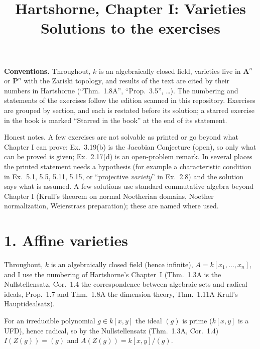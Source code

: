 \documentclass[11pt]{article}
\title{Hartshorne, Chapter I: Varieties\\[2pt]\large Solutions to the exercises}
\author{}
\date{}
\begin{document}
\maketitle
\noindent\textbf{Conventions.} Throughout, $k$ is an algebraically closed field, varieties live in $\mathbf A^n$ or $\mathbf P^n$ with the Zariski topology, and results of the text are cited by their numbers in Hartshorne (``Thm.~1.8A'', ``Prop.~3.5'', \dots). The numbering and statements of the exercises follow the edition scanned in this repository. Exercises are grouped by section, and each is restated before its solution; a starred exercise in the book is marked ``Starred in the book'' at the end of its statement.

Honest notes. A few exercises are not solvable as printed or go beyond what Chapter I can prove: Ex.~3.19(b) is the Jacobian Conjecture (open), so only what can be proved is given; Ex.~2.17(d) is an open-problem remark. In several places the printed statement needs a hypothesis (for example a characteristic condition in Ex.~5.1, 5.5, 5.11, 5.15, or ``projective \emph{variety}'' in Ex.~2.8) and the solution says what is assumed. A few solutions use standard commutative algebra beyond Chapter I (Krull's theorem on normal Noetherian domains, Noether normalization, Weierstrass preparation); these are named where used.

\section*{1. Affine varieties}

Throughout, $k$ is an algebraically closed field (hence infinite), $A=k[x_1,\dots,x_n]$, and I use the numbering of Hartshorne's Chapter~I (Thm.~1.3A is the Nullstellensatz, Cor.~1.4 the correspondence between algebraic sets and radical ideals, Prop.~1.7 and Thm.~1.8A the dimension theory, Thm.~1.11A Krull's Hauptidealsatz).

\pf
For an irreducible polynomial $g\in k[x,y]$ the ideal $(g)$ is prime ($k[x,y]$ is a UFD), hence radical, so by the Nullstellensatz (Thm.~1.3A, Cor.~1.4) $I(Z(g))=(g)$ and $A(Z(g))=k[x,y]/(g)$.
\end{document}
